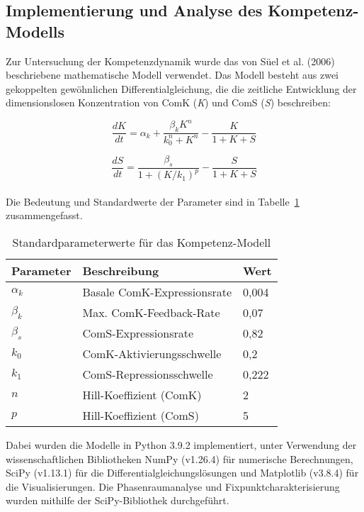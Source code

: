 \documentclass[11pt]{article}
\begin{document}
\subsection{Implementierung und Analyse des Kompetenz-Modells}

Zur Untersuchung der Kompetenzdynamik wurde das von Süel et al. (2006) \cite{suel2006} beschriebene mathematische Modell verwendet. Das Modell besteht aus zwei gekoppelten gewöhnlichen Differentialgleichung, die die zeitliche Entwicklung der dimensionslosen Konzentration von ComK (\textit{K}) und ComS (\textit{S}) beschreiben: 

\begin{equation}
\frac{dK}{dt} = \alpha_k + \frac{\beta_k K^n}{k_0^n + K^n} - \frac{K}{1 + K + S}
\end{equation}

\begin{equation}
\frac{dS}{dt} = \frac{\beta_s}{1 + (K/k_1)^p} - \frac{S}{1 + K + S}
\end{equation}
\\

Die Bedeutung und Standardwerte der Parameter sind in Tabelle~\ref{tab:standardparameter} zusammengefasst. 

\begin{table}[htbp]
\centering
\caption{Standardparameterwerte für das Kompetenz-Modell}
\label{tab:standardparameter}
\begin{tabular}{lll}
\hline
Parameter & Beschreibung & Wert \\
\hline
$\alpha_k$ & Basale ComK-Expressionsrate & 0,004 \\
$\beta_k$ & Max. ComK-Feedback-Rate & 0,07 \\
$\beta_s$ & ComS-Expressionsrate & 0,82 \\
$k_0$ & ComK-Aktivierungsschwelle & 0,2 \\
$k_1$ & ComS-Repressionsschwelle & 0,222 \\
$n$ & Hill-Koeffizient (ComK) & 2 \\
$p$ & Hill-Koeffizient (ComS) & 5 \\
\hline
\end{tabular}
\end{table}

Dabei wurden die Modelle in Python 3.9.2 implementiert, unter Verwendung der wissenschaftlichen Bibliotheken NumPy (v1.26.4) für numerische Berechnungen, SciPy (v1.13.1) für die Differentialgleichungslösungen und Matplotlib (v3.8.4) für die Visualisierungen. Die Phasenraumanalyse und Fixpunktcharakterisierung wurden mithilfe der SciPy-Bibliothek durchgeführt.
\end{document}
